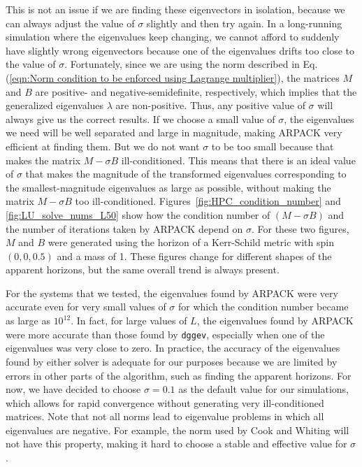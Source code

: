 \documentclass{iopjournal}
\begin{document}
This is not an issue if we are finding these eigenvectors in isolation, because we can always adjust the value of $\sigma$ slightly and then try again. In a long-running simulation where the eigenvalues keep changing, we cannot afford to suddenly have slightly wrong eigenvectors because one of the eigenvalues drifts too close to the value of $\sigma$. Fortunately, since we are using the norm described in Eq.(\ref{eqn:Norm condition to be enforced using Lagrange multiplier}), the matrices $M$ and $B$ are positive- and negative-semidefinite, respectively, which implies that the generalized eigenvalues $\lambda$ are non-positive.
Thus, any positive value of $\sigma$ will always give us the correct results. If we choose a small value of $\sigma$, the eigenvalues we need will be well separated and large in magnitude, making ARPACK very efficient at finding them. But we do not want $\sigma$ to be too small because that makes the matrix $M-\sigma B$ ill-conditioned. This means that there is an ideal value of $\sigma$ that makes the magnitude of the transformed eigenvalues corresponding to the smallest-magnitude eigenvalues as large as possible, without making the matrix $M - \sigma B$ too ill-conditioned. Figures~\ref{fig:HPC_condition_number} and \ref{fig:LU_solve_nums_L50} show how the condition number of $(M- \sigma B)$ and the number of iterations taken by ARPACK depend on $\sigma$. For these two figures, $M$ and $B$ were generated using the horizon of a Kerr-Schild metric with spin $(0,0,0.5)$ and a mass of 1. These figures change for different shapes of the apparent horizons, but the same overall trend is always present. 

For the systems that we tested, the eigenvalues found by ARPACK were very accurate even for very small values of $\sigma$ for which the condition number became as large as $10^{12}$. In fact, for large values of $L$, the eigenvalues found by ARPACK were more accurate than those found by \texttt{dggev}, especially when one of the eigenvalues was very close to zero. In practice, the accuracy of the eigenvalues found by either solver is adequate for our purposes because we are limited by errors in other parts of the algorithm, such as finding the apparent horizons. For now, we have decided to choose $\sigma = 0.1$ as the default value for our simulations, which allows for rapid convergence without generating very ill-conditioned matrices. Note that not all norms lead to eigenvalue problems in which all eigenvalues are negative. For example, the norm used by Cook and Whiting \cite{lovelace08_41} will not have this property, making it hard to choose a stable and effective value for $\sigma$.
\end{document}
